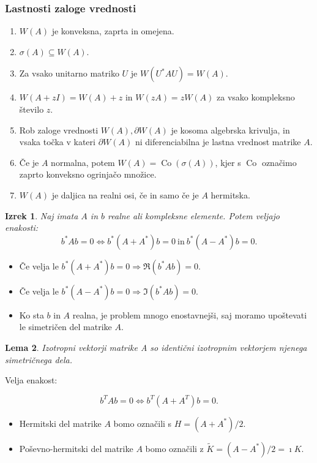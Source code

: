 \documentclass{beamer}
\newcommand{\Co}{\operatorname{Co}} %
\newtheorem{izrek}{Izrek}
\newtheorem{lema}[izrek]{Lema}
\begin{document}
\begin{frame}
\frametitle{Lastnosti zaloge vrednosti}
\begin{enumerate}
\item $W(A)$ je konveksna, zaprta in omejena.
\item $\sigma(A)\subseteq W(A).$
\item Za vsako unitarno matriko $U$ je $W(U^\ast AU)=W(A).$
\item $W(A+zI)=W(A)+z$ in $W(zA)=zW(A)$ za vsako kompleksno število $z$.
\item Rob zaloge vrednosti $W(A), \partial W(A)$ je kosoma algebrska krivulja, in vsaka točka v kateri $\partial W(A)$ ni diferenciabilna je lastna vrednost matrike $A$.
\item Če je $A$ normalna, potem $W(A)=\Co(\sigma(A))$, kjer s $\Co$ označimo zaprto konveksno ogrinjačo množice.
\item $W(A)$ je daljica na realni osi, če in samo če je $A$ hermitska.
\end{enumerate}
\end{frame}
\begin{frame}
\begin{izrek}
Naj imata $A$ in $b$ realne ali kompleksne elemente. Potem veljajo enakosti:
$$b^\ast Ab=0\Leftrightarrow b^\ast (A+A^\ast)b=0 \ \textrm{in}\  b^\ast(A-A^\ast)b=0.$$
\end{izrek}\pause
\begin{itemize}
\item Če velja le $b^\ast (A+A^\ast)b=0 \Rightarrow \Re(b^\ast Ab)=0$.
\item Če velja le $b^\ast(A-A^\ast)b=0 \Rightarrow \Im(b^\ast Ab)=0$.
\item Ko sta $b$ in $A$ realna, je problem mnogo enostavnejši, saj moramo upoštevati le simetričen del matrike $A$.
\end{itemize}
\end{frame}
\begin{frame}
\begin{lema} %
Izotropni vektorji matrike A so identični izotropnim vektorjem njenega simetričnega dela.
\end{lema} \pause
Velja enakost:
\begin{block}{}
$$b^T Ab=0 \Leftrightarrow b^T (A+A^T)b=0.$$ 
\end{block}
\begin{itemize}
\item Hermitski del matrike $A$ bomo označili s $H=(A+A^\ast)/2$.
\item Poševno-hermitski del matrike $A$ bomo označili z $\tilde{K}=(A-A^\ast)/2=\imath K$.
\end{itemize}
\end{frame}
\end{document}
